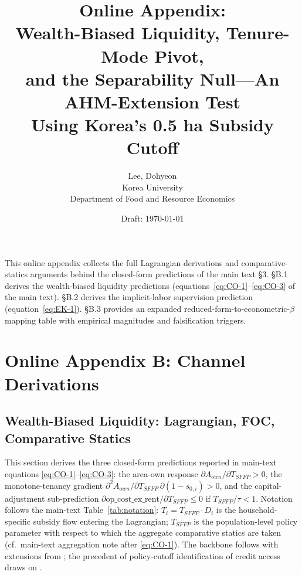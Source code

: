 \documentclass[11pt, a4paper]{article}
\title{Online Appendix:\\
       Wealth-Biased Liquidity, Tenure-Mode Pivot,\\
       and the Separability Null---An AHM-Extension Test\\
       Using Korea's 0.5 ha Subsidy Cutoff}
\author{Lee, Dohyeon\\
        Korea University\\
        Department of Food and Resource Economics}
\date{Draft: \today}
\renewcommand{\thesection}{B}
\begin{document}
\maketitle

\noindent This online appendix collects the full Lagrangian derivations and
comparative-statics arguments behind the closed-form predictions of the
main text \S 3. \S B.1 derives the wealth-biased liquidity predictions
(equations~\ref{eq:CO-1}--\ref{eq:CO-3} of the main text). \S B.2 derives the
implicit-labor supervision prediction (equation~\ref{eq:EK-1}). \S B.3
provides an expanded reduced-form-to-econometric-$\beta$ mapping table with
empirical magnitudes and falsification triggers.

\bigskip

\section*{Online Appendix B: Channel Derivations}
\setcounter{section}{2}  %
\setcounter{equation}{0}

\subsection{Wealth-Biased Liquidity: Lagrangian, FOC, Comparative Statics}
\label{sec:appB-liquidity}

This section derives the three closed-form predictions reported in main-text
equations \ref{eq:CO-1}--\ref{eq:CO-3}: the area-own response
$\partial A_{own}/\partial T_{SFFP} > 0$, the monotone-tenancy gradient
$\partial^2 A_{own} / \partial T_{SFFP}\, \partial(1-s_{0,i}) > 0$, and the
capital-adjustment sub-prediction
$\partial \text{op\_cost\_ex\_rent} / \partial T_{SFFP} \le 0$ if $T_{SFFP}/\tau < 1$.
Notation follows the main-text Table~\ref{tab:notation}: $T_i = T_{SFFP} \cdot D_i$ is
the household-specific subsidy flow entering the Lagrangian; $T_{SFFP}$ is the
population-level policy parameter with respect to which the aggregate comparative
statics are taken (cf.\ main-text aggregation note after \ref{eq:CO-1}). The
backbone follows \citet{CarterOlinto2003_liquidity} with extensions from
\citet{Kazukauskas2013_disinvestment}; the precedent of policy-cutoff
identification of credit access draws on \citet{PittKhandker1998_credit}.
\end{document}
